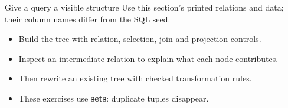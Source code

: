 \begin{frame}[t]{Give a query a visible structure}
Use this section's printed relations and data; their column names differ from the SQL seed.
\medskip
\begin{itemize}
\item Build the tree with relation, selection, join and projection controls.
\item Inspect an intermediate relation to explain what each node contributes.
\item Then rewrite an existing tree with checked transformation rules.
\item These exercises use \textbf{sets}: duplicate tuples disappear.
\end{itemize}
\end{frame}
